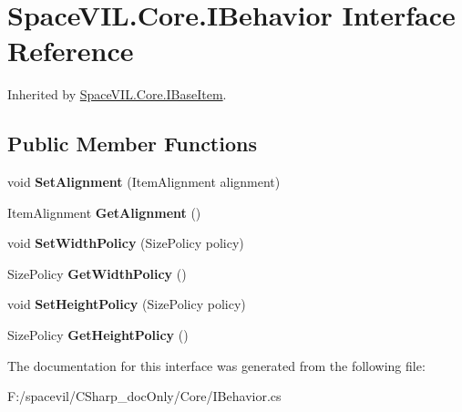 \hypertarget{interface_space_v_i_l_1_1_core_1_1_i_behavior}{}\section{Space\+V\+I\+L.\+Core.\+I\+Behavior Interface Reference}
\label{interface_space_v_i_l_1_1_core_1_1_i_behavior}


Inherited by \mbox{\hyperlink{interface_space_v_i_l_1_1_core_1_1_i_base_item}{Space\+V\+I\+L.\+Core.\+I\+Base\+Item}}.

\subsection*{Public Member Functions}
\begin{DoxyCompactItemize}
\item 
\mbox{\label{interface_space_v_i_l_1_1_core_1_1_i_behavior_a1dac2292f28f54b6ab7a543a372ed3ff}} 
void {\bfseries Set\+Alignment} (Item\+Alignment alignment)
\item 
\mbox{\label{interface_space_v_i_l_1_1_core_1_1_i_behavior_a2eebdc8ff7f573ad44fecd38fc3afefe}} 
Item\+Alignment {\bfseries Get\+Alignment} ()
\item 
\mbox{\label{interface_space_v_i_l_1_1_core_1_1_i_behavior_ad05b17fc4495e98d5acecc52ed87ba0f}} 
void {\bfseries Set\+Width\+Policy} (Size\+Policy policy)
\item 
\mbox{\label{interface_space_v_i_l_1_1_core_1_1_i_behavior_acd5152dbc3db861d85ca0b58f6b83f6d}} 
Size\+Policy {\bfseries Get\+Width\+Policy} ()
\item 
\mbox{\label{interface_space_v_i_l_1_1_core_1_1_i_behavior_ad315b5b729f7b94bcfbf5bd85265a7e8}} 
void {\bfseries Set\+Height\+Policy} (Size\+Policy policy)
\item 
\mbox{\label{interface_space_v_i_l_1_1_core_1_1_i_behavior_aa0a8976a19b412f4f1c564a6a9409ca7}} 
Size\+Policy {\bfseries Get\+Height\+Policy} ()
\end{DoxyCompactItemize}


The documentation for this interface was generated from the following file\+:\begin{DoxyCompactItemize}
\item 
F\+:/spacevil/\+C\+Sharp\+\_\+doc\+Only/\+Core/I\+Behavior.\+cs\end{DoxyCompactItemize}
